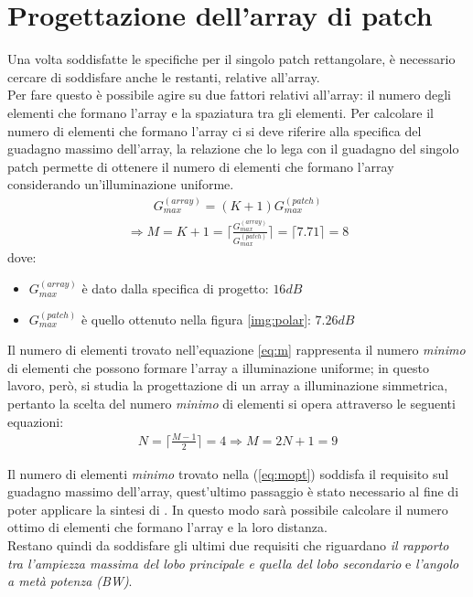 \section{Progettazione dell'array di patch}
Una volta soddisfatte le specifiche per il singolo patch rettangolare, è necessario cercare di soddisfare anche le restanti, relative all'array. \\ 
Per fare questo è possibile agire su due fattori relativi all'array: il numero degli elementi che formano l'array e la spaziatura tra gli elementi. Per calcolare il numero di elementi che formano l'array ci si deve riferire alla specifica del guadagno massimo dell'array, la relazione che lo lega con il guadagno del singolo patch permette di ottenere il numero di elementi che formano l'array considerando un'illuminazione uniforme.
\begin{align*}
G^{(array)}_{max} = (K+1) G^{(patch)}_{max}
\end{align*}
\begin{align}
\label{eq:m}
\Rightarrow M = K + 1 =  \biggr\lceil \frac{G^{(array)}_{max}}{G^{(patch)}_{max}} \biggr\rceil = \lceil 7.71 \rceil = 8
\end{align}
dove:
\begin{itemize}
\item $G^{(array)}_{max}$ è dato dalla specifica di progetto: $16 dB$
\item $G^{(patch)}_{max}$ è quello ottenuto nella figura \ref{img:polar}: $7.26 dB$
\end{itemize}
Il numero di elementi trovato nell'equazione \ref{eq:m} rappresenta il numero \emph{minimo} di elementi che possono formare l'array a illuminazione uniforme; in questo lavoro, però, si studia la progettazione di un array a illuminazione simmetrica, pertanto la scelta del numero \emph{minimo} di elementi si opera attraverso le seguenti equazioni:
\begin{align}
\label{eq:mopt}
N = \biggr\lceil \frac{M-1}{2} \biggr\rceil = 4 \Rightarrow M = 2N + 1 = 9
\end{align}

Il numero di elementi \emph{minimo} trovato nella (\ref{eq:mopt}) soddisfa il requisito sul guadagno massimo dell'array, quest'ultimo passaggio è stato necessario al fine di poter applicare la sintesi di \cheby. In questo modo sarà possibile calcolare il numero ottimo di elementi che formano l'array e la loro distanza. \\
Restano quindi da soddisfare gli ultimi due requisiti che riguardano \emph{il rapporto tra l'ampiezza massima del lobo principale e quella del lobo secondario} e \emph{l'angolo a metà potenza (BW)}. \\

